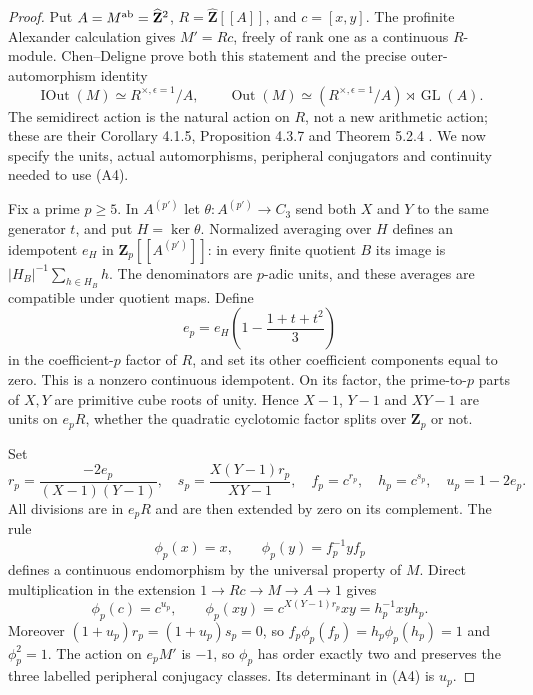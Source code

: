 \documentclass[11pt,oneside]{article}
\begin{document}
\begin{proof}
Put $A=M^{\rm ab}=\widehat{\mathbf Z}^2$,
$R=\widehat{\mathbf Z}[[A]]$, and $c=[x,y]$.
The profinite Alexander calculation gives $M'=Rc$, freely of
rank one as a continuous $R$-module.  Chen--Deligne prove both
this statement and the precise outer-automorphism identity
\[
 \operatorname{IOut}(M)\simeq R^{\times,\epsilon=1}/A,
 \qquad
 \operatorname{Out}(M)\simeq
       (R^{\times,\epsilon=1}/A)\rtimes\operatorname{GL}(A).
                                                               \tag{A4}
\]
The semidirect action is the natural action on $R$, not a
new arithmetic action; these are their Corollary 4.1.5,
Proposition 4.3.7 and Theorem 5.2.4
\cite{A_ChenDeligne2017}.  We now specify the units, actual
automorphisms, peripheral conjugators and continuity needed
to use (A4).

Fix a prime $p\geq5$.  In $A^{(p')}$ let
$\theta:A^{(p')}\to C_3$ send both $X$ and $Y$ to the same
generator $t$, and put $H=\ker\theta$.  Normalized averaging
over $H$ defines an idempotent $e_H$ in
$\mathbf Z_p[[A^{(p')}]]$: in every finite quotient $B$ its
image is $|H_B|^{-1}\sum_{h\in H_B}h$.  The denominators are
$p$-adic units, and these averages are compatible under
quotient maps.  Define
\[
 e_p=e_H\left(1-\frac{1+t+t^2}{3}\right)
\]
in the coefficient-$p$ factor of $R$, and set its other
coefficient components equal to zero.  This is a nonzero
continuous idempotent.  On its factor, the prime-to-$p$
parts of $X,Y$ are primitive cube roots of unity.  Hence
$X-1$, $Y-1$ and $XY-1$ are units on $e_pR$, whether the
quadratic cyclotomic factor splits over $\mathbf Z_p$ or not.

Set
\[
 r_p=\frac{-2e_p}{(X-1)(Y-1)},\quad
 s_p=\frac{X(Y-1)r_p}{XY-1},\quad
 f_p=c^{r_p},\quad h_p=c^{s_p},\quad u_p=1-2e_p.
\]
All divisions are in $e_pR$ and are then extended by zero
on its complement.  The rule
\[
       \phi_p(x)=x,\qquad \phi_p(y)=f_p^{-1}yf_p             \tag{A5}
\]
defines a continuous endomorphism by the universal property
of $M$.  Direct multiplication in the extension
$1\to Rc\to M\to A\to1$ gives
\[
 \phi_p(c)=c^{u_p},\qquad
 \phi_p(xy)=c^{X(Y-1)r_p}xy=h_p^{-1}xyh_p.
\]
Moreover $(1+u_p)r_p=(1+u_p)s_p=0$, so
$f_p\phi_p(f_p)=h_p\phi_p(h_p)=1$ and $\phi_p^2=1$.
The action on $e_pM'$ is $-1$, so $\phi_p$ has order
exactly two and preserves the three labelled peripheral
conjugacy classes.  Its determinant in (A4) is $u_p$.


\end{proof}
\end{document}
